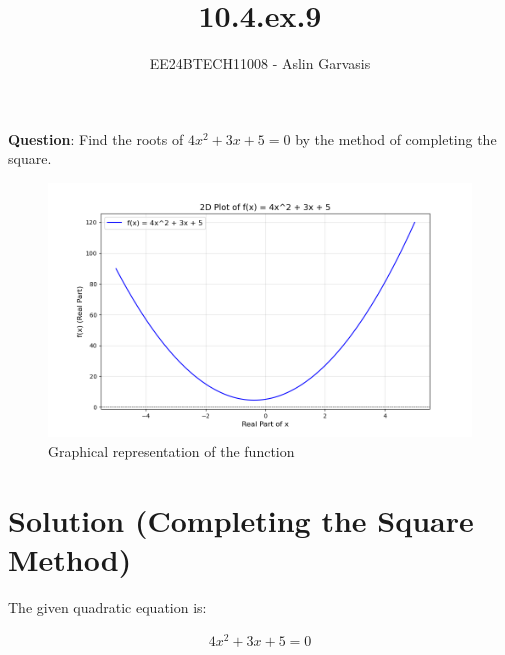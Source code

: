 \documentclass[journal]{IEEEtran}
\begin{document}
	

\vspace{3cm}
	
\title{10.4.ex.9}
\author{EE24BTECH11008 - Aslin Garvasis}
{\let\newpage\relax\maketitle}
	
\renewcommand{\thefigure}{\theenumi}
\renewcommand{\thetable}{\theenumi}
\setlength{\intextsep}{10pt} %
	

\renewcommand{\thetable}{\theenumi}
	
	
\textbf{Question}:\newline
Find the roots of \( 4x^2 + 3x + 5 = 0 \) by the method of completing the square. \\
	

		\begin{figure}[h!]
		\centering
		\includegraphics[width=\columnwidth]{figs/Fig1.png}
			\caption{Graphical representation of the function}
		\label{stemplot}
	\end{figure}
\section*{Solution (Completing the Square Method)}

The given quadratic equation is:

\begin{align}
4x^2 + 3x + 5 = 0
\end{align}
\end{document}
